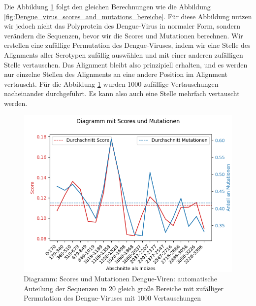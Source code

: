 \documentclass[german,version-2022-01]{uzl-thesis}
\begin{document}
Die Abbildung \ref{fig:Dengue_virus_scores_and_mutations_bereiche_random} folgt den gleichen Berechnungen wie die Abbildung \ref{fig:Dengue_virus_scores_and_mutations_bereiche}. F\"ur diese Abbildung nutzen wir jedoch nicht das Polyprotein des Dengue-Virus in normaler Form, sondern ver\"andern die Sequenzen, bevor wir die Scores und Mutationen berechnen. Wir erstellen eine zuf\"allige Permutation des Dengue-Viruses, indem wir eine Stelle des Alignments aller Serotypen zuf\"allig ausw\"ahlen und mit einer anderen zuf\"alligen Stelle vertauschen. Das Alignment bleibt also prinzipiell erhalten, und es werden nur einzelne Stellen des Alignments an eine andere Position im Alignment vertauscht. F\"ur die Abbildung \ref{fig:Dengue_virus_scores_and_mutations_bereiche_random} wurden 1000 zuf\"allige Vertauschungen nacheinander durchgef\"uhrt. Es kann also auch eine Stelle mehrfach vertauscht werden. 
\begin{figure}[htpb]
  \centering
  \includegraphics[scale=0.75]{Images/Diagramm_Scores_und_Mutationen_Dengue_viren_Bereiche_random.png}
  \caption{Diagramm: Scores und Mutationen Dengue-Viren: automatische Auteilung der Sequenzen in 20 gleich gro\ss{}e Bereiche mit zuf\"alliger Permutation des Dengue-Viruses mit 1000 Vertauschungen}
  \label{fig:Dengue_virus_scores_and_mutations_bereiche_random}
\end{figure}
\end{document}
